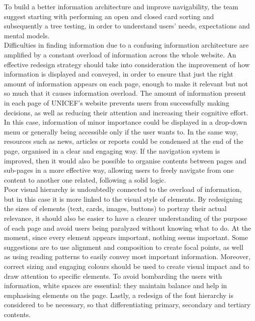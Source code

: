 To build a better information architecture and improve navigability, the team suggest starting with performing an open and closed card sorting and subsequently a tree testing, in order to understand users’ needs, expectations and mental models.\\

Difficulties in finding information due to a confusing information architecture are amplified by a constant overload of information across the whole website. An effective redesign strategy should take into consideration the improvement of how information is displayed and conveyed, in order to ensure that just the right amount of information appears on each page, enough to make it relevant but not so much that it causes information overload.
The amount of information present in each page of UNICEF’s website prevents users from successfully making decisions, as well as reducing their attention and increasing their cognitive effort. In this case, information of minor importance could be displayed in a drop-down menu or generally being accessible only if the user wants to. In the same way, resources such as news, articles or reports could be condensed at the end of the page, organised in a clear and engaging way. If the navigation system is improved, then it would also be possible to organise contents between pages and sub-pages in a more effective way, allowing users to freely navigate from one content to another one related, following a solid logic.\\

Poor visual hierarchy is undoubtedly connected to the overload of information, but in this case it is more linked to the visual style of elements. By redesigning the sizes of elements (text, cards, images, buttons) to portray their actual relevance, it should also be easier to have a clearer understanding of the purpose of each page and avoid users being paralyzed without knowing what to do. At the moment, since every element appears important, nothing seems important. Some suggestions are to use alignment and composition to create focal points, as well as using reading patterns to easily convey most important information. Moreover, correct sizing and engaging colours should be used to create visual impact and to draw attention to specific elements. To avoid bombarding the users with information, white spaces are essential: they maintain balance and help in emphasising elements on the page. Lastly, a redesign of the font hierarchy is considered to be necessary, so that differentiating primary, secondary and tertiary contents.\\

